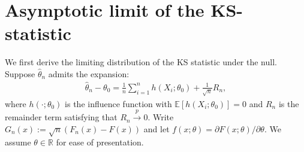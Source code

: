\documentclass[11pt]{article}
\begin{document}
\section{Asymptotic limit of the KS-statistic}
We first derive the limiting distribution of the KS statistic under the null. Suppose $\hat{\theta}_n$ admits the expansion:
\begin{align}\label{eq-expan}
\hat{\theta}_n-\theta_0 = \frac{1}{n}\sum^{n}_{i=1}h(X_i;\theta_0) + \frac{1}{\sqrt{n}}R_n,    
\end{align}
where $h(\cdot;\theta_0)$ is the influence function with $\mathbb{E}[h(X_i;\theta_0)]=0$ and $R_n$ is the remainder term satisfying that
$R_n\overset{p}{\rightarrow} 0.$ Write $G_n(x):=\sqrt{n}(F_n(x)-F(x))$ and let $f(x;\theta)=\partial F(x;\theta)/\partial \theta$. We assume $\theta \in \mathbb{R}$ for ease of presentation.
\end{document}
